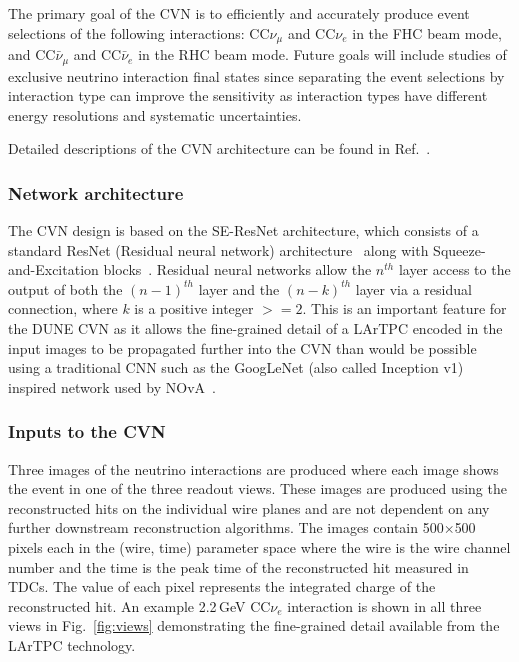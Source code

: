 The primary goal of the CVN is to efficiently and accurately produce event selections of the following interactions: CC$\nu_\mu$ and CC$\nu_e$ in the FHC beam mode, and CC$\bar{\nu}_\mu$ and CC$\bar{\nu}_e$ in the RHC beam mode. Future goals will include studies of exclusive neutrino interaction final states since separating the event selections by interaction type can improve the sensitivity as interaction types have different energy resolutions and systematic uncertainties.

Detailed descriptions of the CVN architecture can be found in Ref.~\cite{cvnPaper}.

\subsubsection{Network architecture}
The CVN design is based on the SE-ResNet architecture, which consists of a standard ResNet (Residual neural network) architecture~\cite{He-et-al-2015-deep} along with Squeeze-and-Excitation blocks~\cite{Hu-et-al-2017-squeeze}. Residual neural networks allow the $n^{th}$ layer access to the output of both the $(n-1)^{th}$ layer and the $(n-k)^{th}$ layer via a residual connection, where $k$ is a positive integer $>=2$. This is an important feature for the DUNE CVN as it allows the fine-grained detail of a LArTPC encoded in the input images to be propagated further into the CVN than would be possible using a traditional CNN such as the GoogLeNet (also called Inception v1)~\cite{GoogLeNet} inspired network used by NOvA~\cite{novacvn}.

\subsubsection{Inputs to the CVN}
\label{sec:inputs}
Three images of the neutrino interactions are produced where each image shows the event in one of the three readout views. These images are produced using the reconstructed hits on the individual wire planes and are not dependent on any further downstream reconstruction algorithms. The images contain 500$\times$500 pixels each in the (wire, time) parameter space where the wire is the wire channel number and the time is the peak time of the reconstructed hit measured in TDCs. The value of each pixel represents the integrated charge of the reconstructed hit. An example 2.2\,GeV CC$\nu_e$ interaction is shown in all three views in Fig.~\ref{fig:views} demonstrating the fine-grained detail available from the LArTPC technology.

